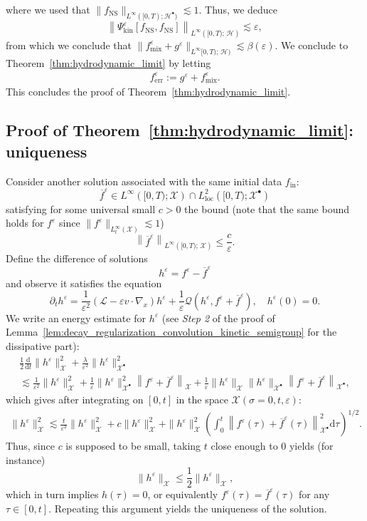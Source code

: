 \documentclass[10pt]{amsart}
\theoremstyle{definition}\newtheorem{defi}[theo]{Definition}\newtheorem{rema}[theo]{Remark}\newtheorem{exam}[theo]{Example}\newtheorem{exem}[theo]{Example}\newtheorem{nota}[theo]{Notation}
\newcommand{\ini}{\mathrm{in}}
\newcommand{\err}{\mathrm{err}}
\newcommand{\ns}{\mathrm{NS}}
\newcommand{\mix}{\mathrm{mix}}
\newcommand{\kin}{\mathrm{kin}}
\renewcommand{\d}{\mathrm{d}}
\newcommand{\XX}{\mathcal{X}}
\newcommand{\HH}{\mathcal{H}}
\newcommand{\LL}{\mathcal{L}}
\newcommand{\QQ}{\mathcal{Q}}
\newcommand{\GGG}{\mathscr{X}}
\newcommand{\SSs}{\HH}
\newcommand{\SSsp}{\HH^{\bullet}}
\newcommand{\SSl}{\XX}
\newcommand{\SSlp}{\XX^{\bullet}}
\newcommand{\SSSl}{\GGG}
\renewcommand*\le{\leqslant}
\newcommand*\eps{{\varepsilon}}
\begin{document}
where we used that $\| f_\ns \|_{ L^\infty([0, T) ; \SSsp ) } \lesssim 1$. Thus, we deduce
\[
\left\| \Psi^\eps_\kin[f_\ns, f_\ns] \right\|_{ L^\infty\left([0, T);\,\SSs \right) } \lesssim \eps,
\]
from which we conclude that $\| f^\eps_\mix + g^\eps \|_{ L^\infty[0, T);\,\SSs)} \lesssim \beta(\eps).$ We conclude to Theorem~\ref{thm:hydrodynamic_limit} by letting
\begin{gather*}
f^\eps_\err := g^\eps + f^\eps_\mix.
\end{gather*}
This concludes the proof of Theorem~\ref{thm:hydrodynamic_limit}.

\subsection{Proof of Theorem~\ref{thm:hydrodynamic_limit}: uniqueness}\label{scn:uniqueness_simmetrizable}

Consider another solution associated with the same initial data $f_\ini$:
\[
\overline{f}^\eps \in L^\infty\left([0, T) ; \SSl \right) \cap L^2_{\text{loc}}\left([0, T) ; \SSlp \right)
\]
satisfying for some universal small $c > 0$ the bound (note that the same bound holds for $f^\eps$ since $\| f^\eps \|_{L^\infty_t (\SSl)} \lesssim 1$)
\[
\left\| \overline{f}^\eps\right\|_{ L^\infty \left([0, T) ;\,\SSl \right) } \le \frac{c}{\eps}.
\]
Define the difference of solutions
\[
h^\eps = f^\eps - \overline{f}^\eps
\]
and observe it satisfies the equation
\[
\partial_t h^\eps = \frac{1}{\eps^2} \left(\LL - \eps v \cdot \nabla_x \right) h^\eps + \frac{1}{\eps} \QQ \left(h^\eps, f^\eps + \overline{f}^\eps \right), \quad h^\eps(0) = 0.
\]
We write an energy estimate for $h^\eps$ (see \emph{Step 2} of the proof of Lemma~\ref{lem:decay_regularization_convolution_kinetic_semigroup} for the dissipative part):
\begin{multline*}
\frac{1}{2} \frac{\d}{\d t} \| h^\eps \|^2_{ \SSl } + \frac{\lambda}{\eps^2} \| h^\eps \|^2_{ \SSlp }\\ \lesssim \frac{1}{\eps^2} \| h^\eps \|^2_{ \SSl } + \frac{1}{\eps} \| h^\eps \|_{ \SSlp }^2 \left\| f^\eps + \overline{f}^\eps \right\|_{ \SSl } + \frac{1}{\eps} \| h^\eps \|_{ \SSl } \| h^\eps \|_{ \SSlp } \left\| f^\eps + \overline{f}^\eps \right\|_{ \SSlp },
\end{multline*}
which gives after integrating on $[0, t]$ in the space $\SSSl(\sigma=0, t, \eps)$:
\begin{align*}
\| h^\eps \|_{ \SSSl }^2 \lesssim \frac{t}{\eps^2} \| h^\eps \|_{ \SSSl }^2 + c \| h^\eps \|_{ \SSSl }^2 + \| h^\eps \|_{ \SSSl }^2 \left(\int_0^t \left\| f^\eps(\tau) + \overline{f}^\eps(\tau) \right\|^2_{\SSlp} \d \tau\right)^{1/2}.
\end{align*}
Thus, since $c$ is supposed to be small, taking $t$ close enough to $0$ yields (for instance)
\[
\| h^\eps \|_{ \SSSl } \le \frac{1}{2} \| h^\eps \|_{ \SSSl },
\]
which in turn implies $h(\tau) = 0$, or equivalently $f^\eps(\tau) = \overline{f}^\eps(\tau)$ for any $\tau \in [0, t]$. Repeating this argument yields the uniqueness of the solution.
\end{document}
